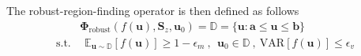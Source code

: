The robust-region-finding operator is then defined as follows 
\begin{equation}
\begin{aligned} 
& \mathbf{\Phi}_{\text{robust}}(f(\mathbf{u}),\mathbf{S}_{z},\mathbf{u}_{0}) = \mathbb{D} = \{\mathbf{u}: \mathbf{a} \leq \mathbf{u} \leq \mathbf{b}\} \\
  \text{s.t.}&~~ \mathbb{E}_{\mathbf{u}\sim \mathbb{D}} [f(\mathbf{u})] \ge 1-\epsilon_{m}~, ~~ \mathbf{u}_{0} \in \mathbb{D} ~, ~ \text{VAR}[f(\mathbf{u})] \le \epsilon_{v}
\label{eq:phi-rob-sup}
\end{aligned}
\end{equation}
